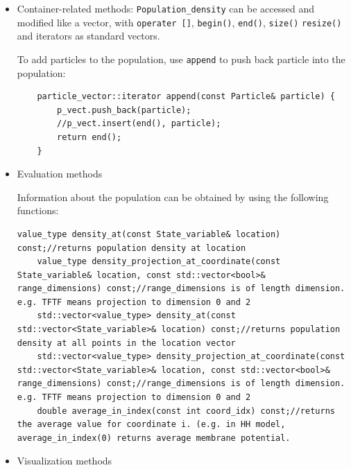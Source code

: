 \documentclass[10pt]{article} %
\begin{document}
\begin{itemize}
\begin{itemize}
\item 
Container-related methods:
\texttt{Population\_density} can be accessed and modified like a vector, with \texttt{operater []}, \texttt{begin()}, \texttt{end()}, \texttt{size()} \texttt{resize()} and iterators as standard vectors.

To add particles to the population, use \texttt{append} to push back particle into the population:
\begin{lstlisting}
	particle_vector::iterator append(const Particle& particle) {
		p_vect.push_back(particle);
		//p_vect.insert(end(), particle);
		return end();
	}
\end{lstlisting}
\item
Evaluation methods

Information about the population can be obtained by using the following functions:
\begin{lstlisting}
value_type density_at(const State_variable& location) const;//returns population density at location
	value_type density_projection_at_coordinate(const State_variable& location, const std::vector<bool>& range_dimensions) const;//range_dimensions is of length dimension. e.g. TFTF means projection to dimension 0 and 2
	std::vector<value_type> density_at(const std::vector<State_variable>& location) const;//returns population density at all points in the location vector
	std::vector<value_type> density_projection_at_coordinate(const std::vector<State_variable>& location, const std::vector<bool>& range_dimensions) const;//range_dimensions is of length dimension. e.g. TFTF means projection to dimension 0 and 2
	double average_in_index(const int coord_idx) const;//returns the average value for coordinate i. (e.g. in HH model, average_in_index(0) returns average membrane potential.
\end{lstlisting}
\item
Visualization methods


\end{itemize}
\end{itemize}
\end{document}
